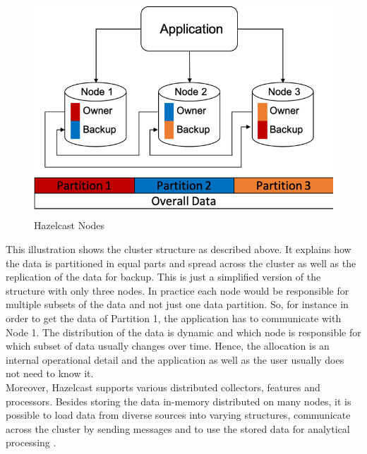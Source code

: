 \begin{figure}[ht]
    \centering
    \includegraphics{content/images/hazelcast-nodes.png}
    \caption{Hazelcast Nodes \cite{johns2015}}
\end{figure}
This illustration shows the cluster structure as described above. It explains how the data is partitioned in equal parts and spread across the cluster as well as the replication of the data for backup. This is just a simplified version of the structure with only three nodes. In practice each node would be responsible for multiple subsets of the data and not just one data partition. So, for instance in order to get the data of Partition 1, the application has to communicate with Node 1. The distribution of the data is dynamic and which node is responsible for which subset of data usually changes over time. Hence, the allocation is an internal operational detail and the application as well as the user usually does not need to know it. \\
Moreover, Hazelcast supports various distributed collectors, features and processors. Besides storing the data in-memory distributed on many nodes, it is possible to load data from diverse sources into varying structures, communicate across the cluster by sending messages and to use the stored data for analytical processing \cite{johns2015}.


